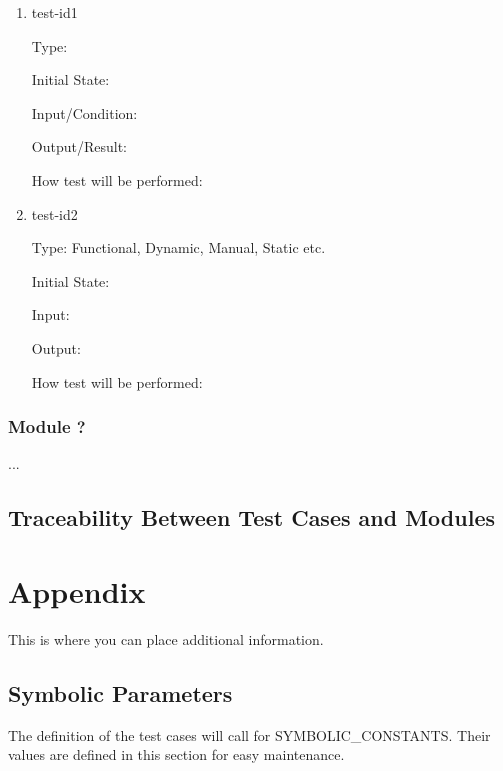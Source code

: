 \documentclass[12pt, titlepage]{article}
\begin{document}
\begin{enumerate}

\item{test-id1\\}

Type: 
					
Initial State: 
					
Input/Condition: 
					
Output/Result: 
					
How test will be performed: 
					
\item{test-id2\\}

Type: Functional, Dynamic, Manual, Static etc.
					
Initial State: 
					
Input: 
					
Output: 
					
How test will be performed: 

\end{enumerate}

\subsubsection{Module ?}

...

\subsection{Traceability Between Test Cases and Modules}

				




\newpage

\section{Appendix}

This is where you can place additional information.

\subsection{Symbolic Parameters}

The definition of the test cases will call for SYMBOLIC\_CONSTANTS.
Their values are defined in this section for easy maintenance.
\end{document}
